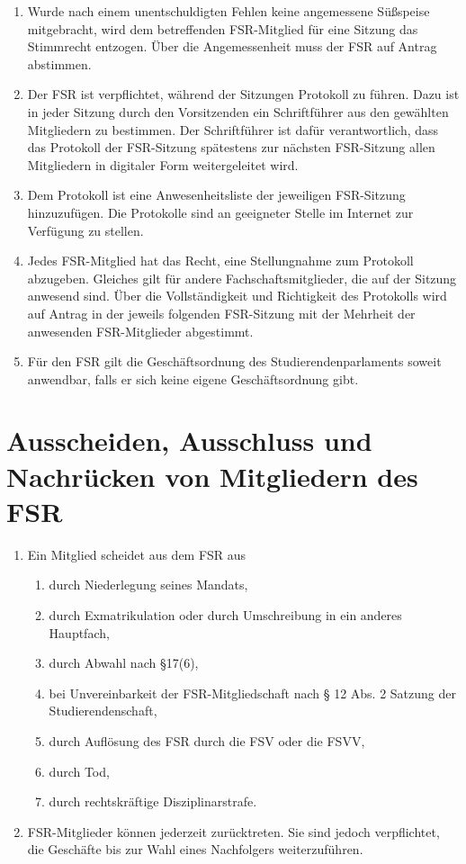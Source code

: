 \documentclass{article}
\providecommand{\tightlist}{\setlength{\itemsep}{0pt}\setlength{\parskip}{0pt}}
\begin{document}
\begin{enumerate}[(1)]
	\item Wurde nach einem unentschuldigten Fehlen keine angemessene Süßspeise mitgebracht, wird dem betreffenden FSR-Mitglied für eine Sitzung das Stimmrecht entzogen. Über die Angemessenheit muss der FSR auf Antrag abstimmen.
	\item Der FSR ist verpflichtet, während der Sitzungen Protokoll zu führen. Dazu ist in jeder Sitzung durch den Vorsitzenden ein Schriftführer aus den gewählten Mitgliedern zu bestimmen. Der Schriftführer ist dafür verantwortlich, dass das Protokoll der FSR-Sitzung spätestens zur nächsten FSR-Sitzung allen Mitgliedern in digitaler Form weitergeleitet wird.
	\item Dem Protokoll ist eine Anwesenheitsliste der jeweiligen FSR-Sitzung hinzuzufügen. Die Protokolle sind an geeigneter Stelle im Internet zur Verfügung zu stellen.
	\item Jedes FSR-Mitglied hat das Recht, eine Stellungnahme zum Protokoll abzugeben. Gleiches gilt für andere Fachschaftsmitglieder, die auf der Sitzung anwesend sind. Über die Vollständigkeit und Richtigkeit des Protokolls wird auf Antrag in der jeweils folgenden FSR-Sitzung mit der Mehrheit der anwesenden FSR-Mitglieder abgestimmt.
	\item Für den FSR gilt die Geschäftsordnung des Studierendenparlaments soweit anwendbar, falls er sich keine eigene Geschäftsordnung gibt.
\end{enumerate}

\section{Ausscheiden, Ausschluss und Nachrücken von Mitgliedern des FSR}\label{ausscheiden-ausschluss-und-nachruxfccken-von-mitgliedern-des-fsr}

\begin{enumerate}[(1)]
	\item Ein Mitglied scheidet aus dem FSR aus
	\begin{enumerate}[1.]
		\tightlist
		\item durch Niederlegung seines Mandats,
		\item durch Exmatrikulation oder durch Umschreibung in ein anderes Hauptfach,
		\item durch Abwahl nach §17(6),
		\item bei Unvereinbarkeit der FSR-Mitgliedschaft nach § 12 Abs. 2 Satzung der Studierendenschaft,
		\item durch Auflösung des FSR durch die FSV oder die FSVV,
		\item durch Tod,
		\item durch rechtskräftige Disziplinarstrafe.
	\end{enumerate}
	\item FSR-Mitglieder können jederzeit zurücktreten. Sie sind jedoch verpflichtet, die Geschäfte bis zur Wahl eines Nachfolgers weiterzuführen.
\end{enumerate}
\end{document}
